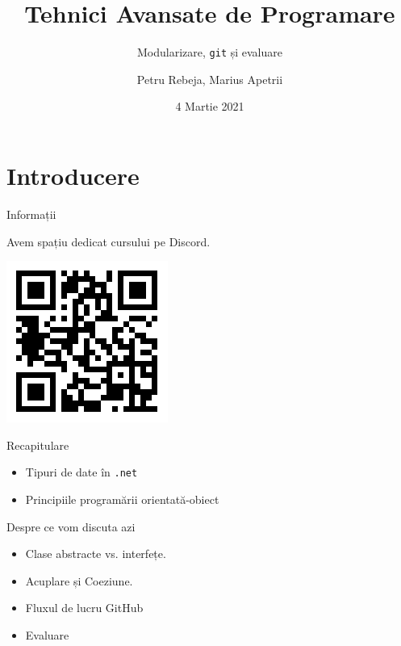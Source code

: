 \documentclass[presentation]{beamer}
\author{Petru Rebeja, Marius Apetrii}
\date{4 Martie 2021}
\title{Tehnici Avansate de Programare}
\subtitle{Modularizare, \texttt{git} și evaluare}
\institute[UAIC]{Facultatea de Matematică\\Universitatea Alexandru Ioan Cuza, Iași}
\begin{document}
\maketitle
\section{Introducere}
\label{sec:org735d22f}
\begin{frame}[label={sec:org7faad61}]{Informații}
\begin{center}
Avem spațiu dedicat cursului pe Discord.
\end{center}
\begin{center}
\includegraphics[height=0.5\textheight]{img/qr-discord-server.png}
\end{center}
\end{frame}
\begin{frame}[label={sec:org7bdca18},fragile]{Recapitulare}
 \pause
\begin{itemize}
\item Tipuri de date în \texttt{.net}
\end{itemize}
\pause
\begin{itemize}
\item Principiile programării orientată-obiect
\end{itemize}
\end{frame}
\begin{frame}[label={sec:org0698e89}]{Despre ce vom discuta azi}
\begin{itemize}
\item Clase abstracte vs. interfețe.
\item Acuplare și Coeziune.
\item Fluxul de lucru GitHub
\item Evaluare
\end{itemize}
\end{frame}
\end{document}
